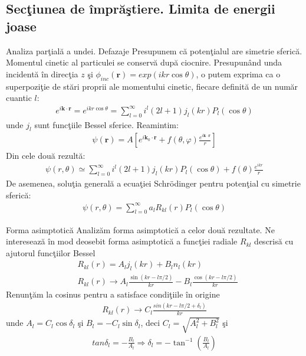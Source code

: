 \subsection{Sec\c{t}iunea de \^{i}mpr\u{a}\c{s}tiere. Limita de energii joase}
\begin{frame}[allowframebreaks]{Analiza par\c{t}ial\u{a} a undei. Defazaje}
Presupunem c\u{a} poten\c{t}ialul are simetrie sferic\u{a}. Momentul cinetic al particulei se conserv\u{a} dup\u{a} ciocnire. Presupun\^{a}nd unda incident\u{a} \^{i}n direc\c{t}ia $z$ \c{s}i $\phi_{inc}({\bm r})=exp(ikr\cos\theta)$, o putem exprima  ca o superpozi\c{t}ie de st\u{a}ri proprii ale momentului cinetic, fiecare definit\u{a} de un num\u{a}r cuantic $l$:
\begin{align}
e^{i{\bm k}\cdot{\bm r}}=e^{ikr\cos\theta}=\sum_{l=0}^{\infty}i^l(2l+1)j_l(kr)P_l(\cos\theta) 
\end{align}
unde $j_l$ sunt func\c{t}iile Bessel sferice. Reamintim:
\begin{align}
\psi({\bm r})=A \left[ e^{i{\bm k_0}\cdot{\bm r}}+f(\theta,\varphi)\frac{e^{i{\bm k}\cdot{\bm r}}}{r}\right]
\end{align}
Din cele dou\u{a} rezult\u{a}:
\begin{align}
\psi(r,\theta)\simeq\sum_{l=0}^{\infty}i^l(2l+1)j_l(kr)P_l(\cos\theta)+f(\theta)\frac{e^{ikr}}{r}
\end{align}
De asemenea, solu\c{t}ia general\u{a} a ecua\c{t}iei Schr\"{o}dinger pentru poten\c{t}ial cu simetrie sferic\u{a}:
\begin{align}
\psi(r,\theta)=\sum_{l=0}^{\infty}a_lR_{kl}(r)P_l(\cos\theta) 
\end{align}
\end{frame} 

\begin{frame}[allowframebreaks]{Forma asimptotic\u{a}}
Analiz\u{a}m forma asimptotic\u{a} a celor dou\u{a} rezultate. Ne intereseaz\u{a} \^{i}n mod deosebit forma asimptotic\u{a} a func\c{t}iei radiale $R_{kl}$ descris\u{a} cu ajutorul func\c{t}iilor Bessel
\begin{align}
&R_{kl}(r)=A_lj_l(kr)+B_ln_l(kr)\\
&R_{kl}(r) \to A_l \frac{\sin(kr-l\pi/2)}{kr}-B_l\frac{\cos(kr-l\pi/2)}{kr}
\end{align}
Renun\c{t}\u{a}m la cosinus pentru a satisface condi\c{t}iile \^{i}n origine
\begin{align}
R_{kl}(r)\to C_l\frac{sin(kr-l\pi/2+\delta_l)}{kr}
\end{align}
unde $A_l=C_l\cos\delta_l$ \c{s}i $B_l=-C_l\sin\delta_l$, deci $C_l=\sqrt{A^2_l+B^2_l}$ \c{s}i
\begin{align}
tan\delta_l=-\frac{B_l}{A_l} \Rightarrow \delta_l=-\tan^{-1}\left(\frac{B_l}{A_l}\right)
\end{align}
\end{frame} 

